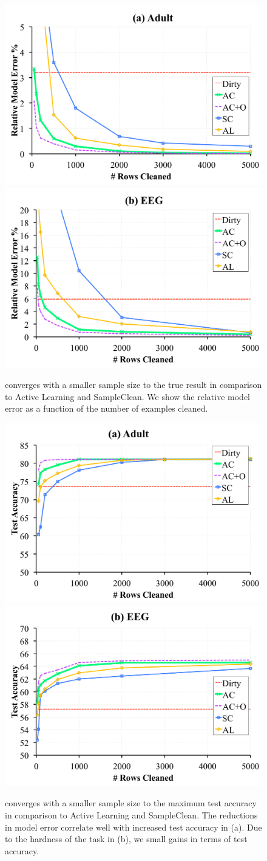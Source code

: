 \begin{figure}[ht!]
\centering
 \includegraphics[width=0.49\columnwidth]{exp/exp3b.pdf}
  \includegraphics[width=0.49\columnwidth]{exp/exp3c.pdf}
 \caption{\sys converges with a smaller sample size to the true result in comparison to Active Learning and SampleClean. We show the relative model error as a function of the number of examples cleaned. \label{prio-perf}}
\end{figure}
\begin{figure}[ht!]
\centering
 \includegraphics[width=0.49\columnwidth]{exp/exp3bb.pdf}
  \includegraphics[width=0.49\columnwidth]{exp/exp3cc.pdf}
 \caption{\sys converges with a smaller sample size to the maximum test accuracy in comparison to Active Learning and SampleClean. The reductions in model error correlate well with increased test accuracy in (a). Due to the hardness of the task in (b), we small gains in terms of test accuracy. \label{prio-tperf}}
\end{figure}

